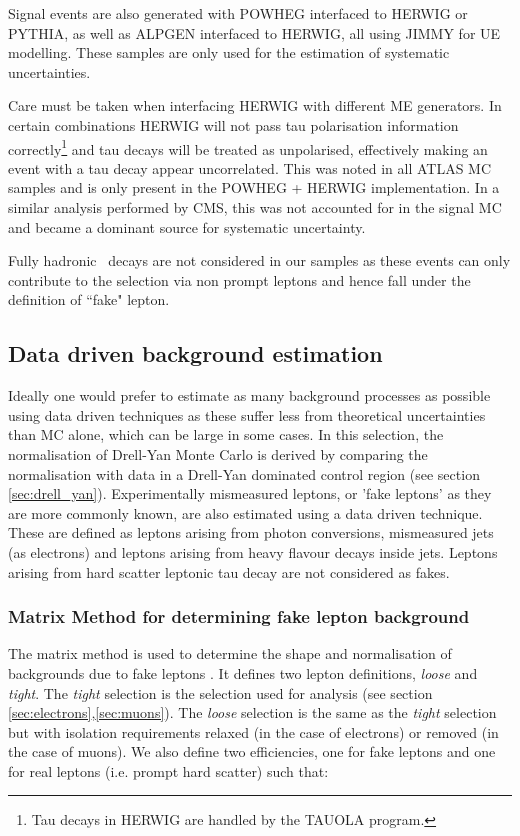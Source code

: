 Signal events are also generated with POWHEG interfaced to HERWIG or PYTHIA, as well as ALPGEN interfaced to HERWIG, all using JIMMY for UE modelling. These samples are only used for the estimation of systematic uncertainties.

Care must be taken when interfacing HERWIG with different ME generators. In certain combinations HERWIG will not pass tau polarisation information correctly\footnote{Tau decays in HERWIG are handled by the TAUOLA program.} and tau decays will be treated as unpolarised, effectively making an event with a tau decay appear uncorrelated. This was noted in all ATLAS MC samples and is only present in the POWHEG + HERWIG implementation. In a similar analysis performed by CMS, this was not accounted for in the signal MC and became a dominant source for systematic uncertainty.  

Fully hadronic \ttbar\ decays are not considered in our samples as these events can only contribute to the selection via non prompt leptons and hence fall under the definition of ``fake" lepton. 

\subsection{Data driven background estimation}

Ideally one would prefer to estimate as many background processes as possible using data driven techniques as these suffer less from theoretical uncertainties than MC alone, which can be large in some cases. In this selection, the normalisation of Drell-Yan Monte Carlo is derived by comparing the normalisation with data in a Drell-Yan dominated control region (see section \ref {sec:drell_yan}). Experimentally mismeasured leptons, or 'fake leptons' as they are more commonly known, are also estimated using a data driven technique. These are defined as leptons arising from photon conversions, mismeasured jets (as electrons) and leptons arising from heavy flavour decays inside jets. Leptons arising from hard scatter leptonic tau decay are not considered as fakes. 

\subsubsection*{Matrix Method for determining fake lepton background}

The matrix method is used to determine the shape and normalisation of backgrounds due to fake leptons \cite{fakes}\cite{topwg}. It defines two lepton definitions, \emph{loose} and \emph{tight}. The \emph{tight} selection is the selection used for analysis (see section \ref{sec:electrons},\ref{sec:muons}). The \emph{loose} selection is the same as the \emph{tight} selection but with isolation requirements relaxed (in the case of electrons) or removed (in the case of muons). 
We also define two efficiencies, one for fake leptons and one for real leptons (i.e. prompt hard scatter) such that:

